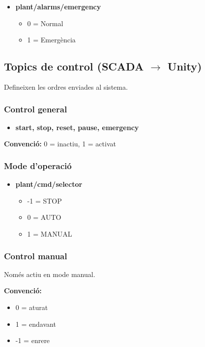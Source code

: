 \documentclass[12pt,a4paper]{report}
\begin{document}
\begin{itemize}
\item \textbf{plant/alarms/emergency}
\begin{itemize}
\item 0 = Normal
\item 1 = Emergència
\end{itemize}
\end{itemize}

\subsection{Topics de control (SCADA $\rightarrow$ Unity)}

Defineixen les ordres enviades al sistema.

\subsubsection{Control general}

\begin{itemize}
\item \textbf{start, stop, reset, pause, emergency}
\end{itemize}

\textbf{Convenció:} 0 = inactiu, 1 = activat

\subsubsection{Mode d'operació}

\begin{itemize}
\item \textbf{plant/cmd/selector}
\begin{itemize}
\item -1 = STOP
\item 0 = AUTO
\item 1 = MANUAL
\end{itemize}
\end{itemize}

\subsubsection{Control manual}

Només actiu en mode manual.

\textbf{Convenció:}
\begin{itemize}
\item 0 = aturat
\item 1 = endavant
\item -1 = enrere
\end{itemize}
\end{document}
